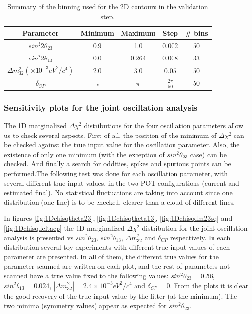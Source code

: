 \begin{table}[h]
\centering
\begin{tabular}{|c|c|c|c|c|}
\hline
 Parameter & Minimum & Maximum & Step & \# bins\\
\hline \hline
$sin^{2}2\theta_{23}$ & 0.9 & 1.0 & 0.002 & 50\\
$sin^{2}2\theta_{13}$ & 0.0 & 0.264 & 0.008 & 33 \\
$\Delta m_{32}^{2} (\times 10^{-3} eV^{2}/c^{4})$ & 2.0& 3.0& 0.05 & 50 \\
$\delta_{CP}$ & -$\pi$ & $\pi$& $\frac{2\pi}{50}$ & 50\\
\hline
\end{tabular}
\caption{Summary of the binning used for the 2D contours in the validation step. }
\label{tab:binning}
\end{table}


\subsubsection{Sensitivity plots for the joint oscillation analysis}

The 1D marginalized $\Delta\chi^{2}$ distributions for the four oscillation parameters allow us to check several aspects. First of all, the position of the minimum of $\Delta\chi^{2}$ can be checked against the true input value for the oscillation parameter. Also, the existence of only one minimum (with the exception of $sin^{2}\theta_{23}$ case) can be checked. And finally a search for oddities, spikes and spurious points can be performed.The following test was done for each oscillation parameter, with several different true input values, in the two POT configurations (current and estimated final). No statistical fluctuations are taking into account since one distribution (one line) is to be checked, clearer than a cloud of different lines. 

In figures \ref{fig:1Dchisqtheta23}, \ref{fig:1Dchisqtheta13}, \ref{fig:1Dchisqdm23sq}  and \ref{fig:1Dchisqdeltacp} the 1D marginalized $\Delta\chi^{2}$ distribution for the joint oscillation analysis is presented vs $sin^{2}\theta_{23}$, $sin^{2}\theta_{13}$, $\Delta m_{32}^{2}$ and $\delta_{CP}$ respectively. In each distribution several toy experiments with different true input values of each parameter are presented. In all of them, the different true values for the parameter scanned are written on each plot, and the rest of parameters not scanned have a true value fixed to the following values: $sin^{2}\theta_{23}=0.56$, $sin^{2}\theta_{13}=0.024$,  $|\Delta m_{32}^{2}| = 2.4 \times 10^{-3} eV^{2}/c^{4}$ and $\delta_{CP}=0$. From the plots it is clear the good recovery of the true input value by the fitter (at the minimum). The two minima (symmetry values) appear as expected for $sin^{2}\theta_{23}$. 

